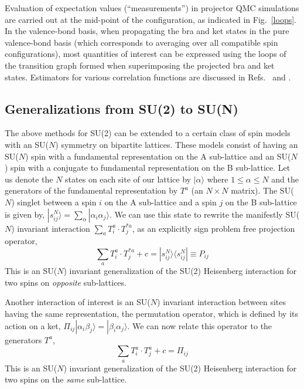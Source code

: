 \documentclass[range]{ar2e}
\begin{document}
Evaluation of expectation values (``measurements'') in projector QMC simulations are carried out at the mid-point of the configuration, as indicated 
in Fig.~\ref{loops}. In the valence-bond basis, when propagating the bra and ket states in the pure valence-bond basis (which corresponds to averaging 
over all compatible spin configurations), most quantities of interest can be expressed using the loops of the transition graph formed when superimposing 
the projected bra and ket states. Estimators for various correlation functions are discussed in Refs.~\cite{Beach06} and \cite{Tang11a}.

\subsection {Generalizations from SU(2) to SU(N)}
\label{ss:su2N}

The above methods for SU(2) can be extended to a certain
class of spin models with an SU($N$) symmetry on bipartite
lattices. These models consist of having an SU($N$) spin with a
fundamental representation on the A sub-lattice and an SU($N$) spin with
a conjugate to fundamental representation on the B sub-lattice. Let us
denote the $N$ states on each site of our lattice by $|\alpha\rangle$ where
$1\leq \alpha \leq N$ 
and the generators of the fundamental representation by $T^a$ (an
$N\times N$ matrix). 
The SU($N$) singlet between a spin $i$ on the A sub-lattice and a spin $j$ on the
B sub-lattice is given by, $|s^N_{ij}\rangle = \sum_\alpha
|\alpha_i\alpha_j\rangle$. We can use this state to rewrite the
manifestly SU($N$) invariant interaction  $\sum_a T^a_i \cdot
T^{*a}_j$, as an explicitly sign problem free projection operator,
\begin{equation}
\sum_a T^a_i \cdot
T^{*a}_j + c = |s^N_{ij}\rangle \langle s^N_{ij}|\equiv P_{ij}
\end{equation}
This is an SU($N$) invariant generalization of the SU(2) Heisenberg interaction
for two spins on {\em opposite} sub-lattices.

Another interaction of interest is an SU($N$) invariant interaction
between sites having the same representation, the permutation
operator, which is defined by its action on a ket,
$\Pi_{ij}|\alpha_i\beta_j\rangle = |\beta_i\alpha_j\rangle$. We can now relate this operator to the generators $T^a$,
\begin{equation}
\sum_a T^a_i \cdot
T^{a}_j + c = \Pi_{ij}
\end{equation}
This is an SU($N$) invariant generalization of the SU(2) Heisenberg
interaction for two spins on the {\em same} sub-lattice.
\end{document}
